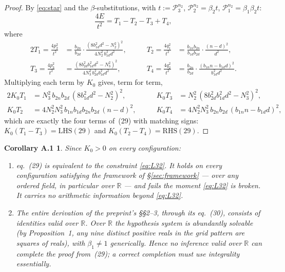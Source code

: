 \documentclass[11pt]{amsart}
\newtheorem*{corA}{Corollary A.1}
\theoremstyle{remark}
\newcommand{\R}{\mathbb{R}}
\newcommand{\cP}{\mathcal{P}}
\begin{document}
\begin{proof}
By \eqref{eq:star} and the $\beta$-substitutions, with $t := \cP_3^{n_2}$,
$\cP_2^{n_2} = \beta_2 t$, $\cP_1^{n_2} = \beta_1\beta_2 t$:
\begin{equation*}
\frac{4E}{t^2} = T_1 - T_2 - T_3 + T_4,
\end{equation*}
where
\begin{alignat*}{2}
T_1 = \frac{4p_2^2}{t^2}
  &= \frac{b_{2n}}{b_{2d}}\cdot
     \frac{(8b_{1d}^2d^2 - N_2^2)^2}{4N_2^2\,b_{1d}^2d^2},
&\qquad
T_2 = \frac{4q_1^2}{t^2}
  &= \frac{b_{1n}b_{2n}}{b_{1d}b_{2d}}\cdot \frac{(n-d)^2}{d^2},\\
T_3 = \frac{4p_3^2}{t^2}
  &= \frac{(8b_{2d}^2b_{1d}^2d^2 - N_3^2)^2}{4N_3^2\,b_{2d}^2b_{1d}^2d^2},
&\qquad
T_4 = \frac{4q_2^2}{t^2}
  &= \frac{b_{2n}}{b_{2d}}\cdot
     \frac{(b_{1n}n - b_{1d}d)^2}{b_{1d}^2d^2}.
\end{alignat*}
Multiplying each term by $K_0$ gives, term for term,
\begin{alignat*}{2}
K_0T_1 &= N_3^2\,b_{2n}b_{2d}\,(8b_{1d}^2d^2 - N_2^2)^2,
&\qquad
K_0T_3 &= N_2^2\,(8b_{2d}^2b_{1d}^2d^2 - N_3^2)^2,\\
K_0T_2 &= 4N_2^2N_3^2\,b_{1n}b_{1d}b_{2n}b_{2d}\,(n-d)^2,
&\qquad
K_0T_4 &= 4N_2^2N_3^2\,b_{2n}b_{2d}\,(b_{1n}n - b_{1d}d)^2,
\end{alignat*}
which are exactly the four terms of~(29) with matching signs:
$K_0(T_1 - T_3) = \mathrm{LHS}(29)$ and $K_0(T_2 - T_4) =
\mathrm{RHS}(29)$.
\end{proof}

\begin{corA}
Since $K_0 > 0$ on every configuration:
\begin{enumerate}
\item eq.~(29) is \emph{equivalent} to the constraint \eqref{eq:L32}.
  It holds on every configuration satisfying the framework of
  \S\ref{sec:framework} --- over any ordered field, in particular over
  $\R$ --- and fails the moment \eqref{eq:L32} is broken. It carries
  no arithmetic information beyond \eqref{eq:L32}.
\item The entire derivation of the preprint's \S\S2--3, through its
  eq.~(30), consists of identities valid over $\R$. Over $\R$ the
  hypothesis system is abundantly solvable (by Proposition~1, any nine
  distinct positive reals in the grid pattern are squares of reals),
  with $\beta_1 \neq 1$ generically. Hence no inference valid over
  $\R$ can complete the proof from~(29); a correct completion must use
  integrality essentially.
\end{enumerate}
\end{corA}
\end{document}
